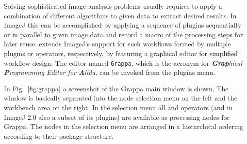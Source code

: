 Solving sophisticated image analysis problems usually requires to apply a combination of different
algorithms to given data to extract desired results. In ImageJ this can be
accomplished by applying a sequence of plugins sequentially or in parallel to given image data and 
record a macro of the processing steps for later reuse. \mitobo extends ImageJ's support for such 
workflows formed by multiple plugins or operators, respectively, by featuring a graphical 
editor for simplified workflow design. The editor named {\tt Grappa}, which is the acronym for 
{\em {\bf \em Grap}hical {\bf \em P}rogramming Editor for {\bf \em A}lida}, can be invoked from the plugins menu.  

In Fig.~\ref{fig:grappa} a screenshot of the Grappa main window is shown. 
The window is basically separated into
the node selection menu on the left and the workbench area on the right. In the selection menu 
all \alida and \mitobo operators (and in ImageJ $2.0$ also a subset of its plugins) are 
available as processing nodes for Grappa. The nodes in the selection menu are arranged in a 
hierarchical ordering according to their package structure. 

